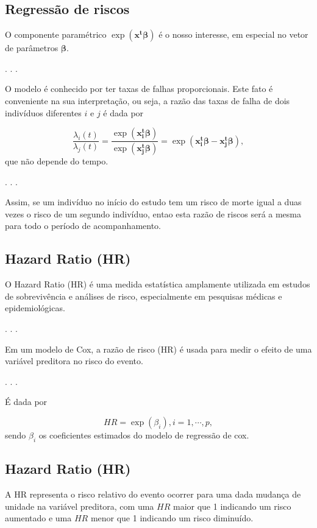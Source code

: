 \documentclass[
  letterpaper,
  DIV=11,
  numbers=noendperiod]{scrartcl}
\begin{document}
\subsection{Regressão de riscos}\label{regressuxe3o-de-riscos-1}

O componente paramétrico \(\exp(\mathbf{x^t \beta})\) é o nosso
interesse, em especial no vetor de parâmetros \(\mathbf{\beta}\).

. . .

O modelo é conhecido por ter taxas de falhas proporcionais. Este fato é
conveniente na sua interpretação, ou seja, a razão das taxas de falha de
dois indivíduos diferentes \(i\) e \(j\) é dada por

\[\dfrac{\lambda_i(t)}{\lambda_j(t)} = \dfrac{\exp(\mathbf{x_i^t \beta})}{\exp(\mathbf{x_j^t \beta})} = \exp(\mathbf{x_i^t \beta} - \mathbf{x_j^t \beta}),\]
que não depende do tempo.

. . .

Assim, se um indivíduo no início do estudo tem um risco de morte igual a
duas vezes o risco de um segundo indivíduo, entao esta razão de riscos
será a mesma para todo o período de acompanhamento.

\subsection{Hazard Ratio (HR)}\label{hazard-ratio-hr}

O Hazard Ratio (HR) é uma medida estatística amplamente utilizada em
estudos de sobrevivência e análises de risco, especialmente em pesquisas
médicas e epidemiológicas.

. . .

Em um modelo de Cox, a razão de risco (HR) é usada para medir o efeito
de uma variável preditora no risco do evento.

. . .

É dada por

\[HR = \exp({\beta_i}), i = 1, \cdots, p,\] sendo \(\beta_i\) os
coeficientes estimados do modelo de regressão de cox.

\subsection{Hazard Ratio (HR)}\label{hazard-ratio-hr-1}

A HR representa o risco relativo do evento ocorrer para uma dada mudança
de unidade na variável preditora, com uma \(HR\) maior que 1 indicando
um risco aumentado e uma \(HR\) menor que 1 indicando um risco
diminuído.
\end{document}
